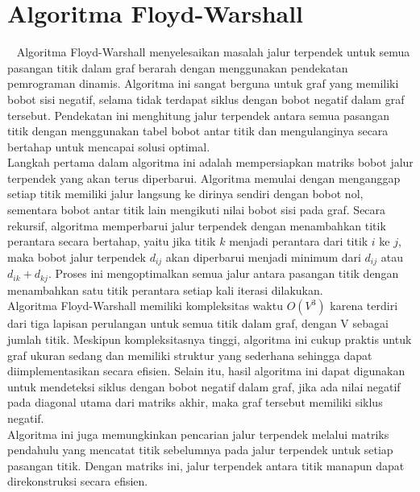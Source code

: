 \section{Algoritma Floyd-Warshall}
\label{floydwarshall}
~\cite{Cormen:09:intro}
Algoritma Floyd-Warshall menyelesaikan masalah jalur terpendek untuk semua pasangan titik dalam graf berarah dengan menggunakan pendekatan pemrograman dinamis. Algoritma ini sangat berguna untuk graf yang memiliki bobot sisi negatif, selama tidak terdapat siklus dengan bobot negatif dalam graf tersebut. Pendekatan ini menghitung jalur terpendek antara semua pasangan titik dengan menggunakan tabel bobot antar titik dan mengulanginya secara bertahap untuk mencapai solusi optimal.
\\
Langkah pertama dalam algoritma ini adalah mempersiapkan matriks bobot jalur terpendek yang akan terus diperbarui. Algoritma memulai dengan menganggap setiap titik memiliki jalur langsung ke dirinya sendiri dengan bobot nol, sementara bobot antar titik lain mengikuti nilai bobot sisi pada graf. Secara rekursif, algoritma memperbarui jalur terpendek dengan menambahkan titik perantara secara bertahap, yaitu jika titik $k$ menjadi perantara dari titik $i$ ke $j$, maka bobot jalur terpendek $d_{ij}$ akan diperbarui menjadi minimum dari $d_{ij}$ atau $d_{ik} + d_{kj}$. Proses ini mengoptimalkan semua jalur antara pasangan titik dengan menambahkan satu titik perantara setiap kali iterasi dilakukan.
\\
Algoritma Floyd-Warshall memiliki kompleksitas waktu $O(V^3)$ karena terdiri dari tiga lapisan perulangan untuk semua titik dalam graf, dengan V sebagai jumlah titik. Meskipun kompleksitasnya tinggi, algoritma ini cukup praktis untuk graf ukuran sedang dan memiliki struktur yang sederhana sehingga dapat diimplementasikan secara efisien. Selain itu, hasil algoritma ini dapat digunakan untuk mendeteksi siklus dengan bobot negatif dalam graf, jika ada nilai negatif pada diagonal utama dari matriks akhir, maka graf tersebut memiliki siklus negatif.
\\
Algoritma ini juga memungkinkan pencarian jalur terpendek melalui matriks pendahulu yang mencatat titik sebelumnya pada jalur terpendek untuk setiap pasangan titik. Dengan matriks ini, jalur terpendek antara titik manapun dapat direkonstruksi secara efisien.

